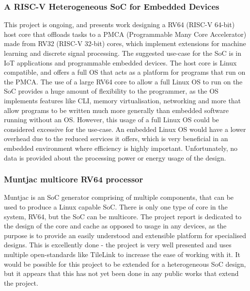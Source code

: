 \subsubsection{A RISC-V Heterogeneous SoC for Embedded Devices\cite{valenterisc}}
This project is ongoing, and presents work designing a RV64 (RISC-V 64-bit) host core that offloads tasks to a PMCA (Programmable Many Core Accelerator) made from RV32 (RISC-V 32-bit) cores, which implement extensions for machine learning and discrete signal processing. The suggested use-case for the SoC is in IoT applications and programmable embedded devices. The host core is Linux compatible, and offers a full OS that acts as a platform for programs that run on the PMCA. The use of a large RV64 core to allow a full Linux OS to run on the SoC provides a huge amount of flexibility to the programmer, as the OS implements features like CLI, memory virtualisation, networking and more that allow programs to be written much more generally than embedded software running without an OS. However, this usage of a full Linux OS could be considered excessive for the use-case. An embedded Linux OS would have a lower overhead due to the reduced services it offers, which is very beneficial in an embedded environment where efficiency is highly important. Unfortunately, no data is provided about the processing power or energy usage of the design.

\subsubsection{Muntjac multicore RV64 processor\cite{UCAM-CL-TR-972}}
Muntjac is an SoC generator comprising of multiple components, that can be used to produce a Linux capable SoC. There is only one type of core in the system, RV64, but the SoC can be multicore. The project report is dedicated to the design of the core and cache as opposed to usage in any devices, as the purpose is to provide an easily understood and extensible platform for specialised designs. This is excellently done - the project is very well presented and uses multiple open-standards like TileLink\cite{tilelink} to increase the ease of working with it. It would be possible for this project to be extended for a heterogeneous SoC design, but it appears that this has not yet been done in any public works that extend the project.

